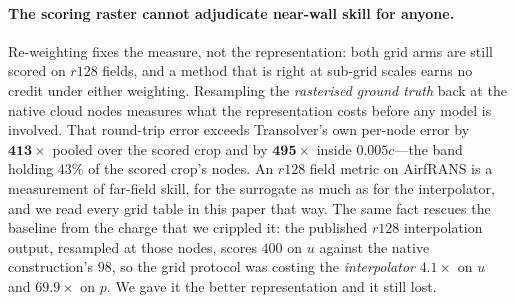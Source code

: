 \paragraph{The scoring raster cannot adjudicate near-wall skill for anyone.}
Re-weighting fixes the measure, not the representation: both grid arms are still
scored on $r128$ fields, and a method that is right at sub-grid scales earns no credit
under either weighting. Resampling the \emph{rasterised ground truth} back at the native
cloud nodes measures what the representation costs before any model is involved. That
round-trip error exceeds Transolver's own per-node error by $\mathbf{413\times}$ pooled
over the scored crop and by $\mathbf{495\times}$ inside $0.005c$---the band holding $43\%$
of the scored crop's nodes. An $r128$ field metric on AirfRANS is a measurement of far-field
skill, for the surrogate as much as for the interpolator, and we read every grid table in
this paper that way. The same fact rescues the baseline from the charge that we crippled
it: the published $r128$ interpolation output, resampled at those nodes, scores $400$ on
$u$ against the native construction's $98$, so the grid protocol was costing the
\emph{interpolator} $4.1\times$ on $u$ and $69.9\times$ on $p$. We gave it the better
representation and it still lost.

